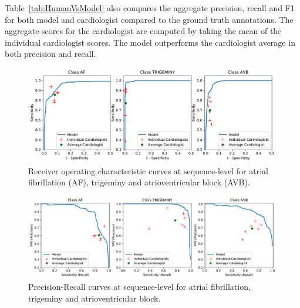 Table~\ref{tab:HumanVsModel} also compares the aggregate precision, recall and
F1 for both  model and cardiologist compared to the ground truth annotations.
The aggregate scores for the cardiologist are computed by taking the mean of
the individual cardiologist scores. The model outperforms the cardiologist
average in both precision and recall.

\begin{figure}
\centering
\includegraphics[width=1.0\textwidth]{arrhythmias/figures/roc_curve.pdf}
\caption{Receiver operating characteristic curves at sequence-level for atrial
         fibrillation (AF), trigeminy and atrioventricular block (AVB).}
\label{fig:arrhythmias:roc_curve}
\end{figure}

\begin{figure}
\centering
\includegraphics[width=1.0\textwidth]{arrhythmias/figures/prec_recall_curve.pdf}
\caption{Precision-Recall curves at sequence-level for atrial fibrillation,
         trigeminy and atrioventricular block.}
\label{fig:arrhythmias:prec_recall_curve}
\end{figure}
